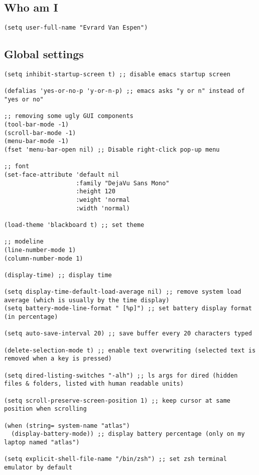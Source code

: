 \documentclass[11pt]{article}
\begin{document}
\subsection{Who am I}
\label{sec-1-3}
\begin{verbatim}
(setq user-full-name "Evrard Van Espen")
\end{verbatim}
\subsection{Global settings}
\label{sec-1-4}
\begin{verbatim}
(setq inhibit-startup-screen t) ;; disable emacs startup screen

(defalias 'yes-or-no-p 'y-or-n-p) ;; emacs asks "y or n" instead of "yes or no"

;; removing some ugly GUI components
(tool-bar-mode -1)
(scroll-bar-mode -1) 
(menu-bar-mode -1) 
(fset 'menu-bar-open nil) ;; Disable right-click pop-up menu

;; font
(set-face-attribute 'default nil
                    :family "DejaVu Sans Mono"
                    :height 120
                    :weight 'normal
                    :width 'normal)

(load-theme 'blackboard t) ;; set theme

;; modeline
(line-number-mode 1)
(column-number-mode 1)

(display-time) ;; display time

(setq display-time-default-load-average nil) ;; remove system load average (which is usually by the time display)
(setq battery-mode-line-format " [%p]") ;; set battery display format (in percentage)

(setq auto-save-interval 20) ;; save buffer every 20 characters typed

(delete-selection-mode t) ;; enable text overwriting (selected text is removed when a key is pressed)

(setq dired-listing-switches "-alh") ;; ls args for dired (hidden files & folders, listed with human readable units)

(setq scroll-preserve-screen-position 1) ;; keep cursor at same position when scrolling

(when (string= system-name "atlas")
  (display-battery-mode)) ;; display battery percentage (only on my laptop named "atlas")

(setq explicit-shell-file-name "/bin/zsh") ;; set zsh terminal emulator by default


\end{verbatim}
\end{document}
